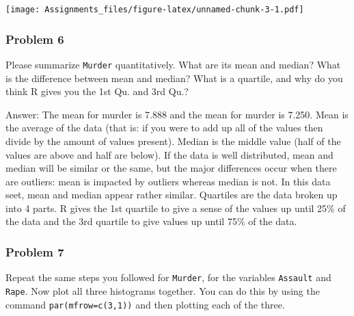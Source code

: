\documentclass[
]{article}
\newenvironment{Shaded}{\begin{snugshade}}{\end{snugshade}}
\newcommand{\DataTypeTok}[1]{\textcolor[rgb]{0.13,0.29,0.53}{#1}}
\newcommand{\DecValTok}[1]{\textcolor[rgb]{0.00,0.00,0.81}{#1}}
\newcommand{\KeywordTok}[1]{\textcolor[rgb]{0.13,0.29,0.53}{\textbf{#1}}}
\newcommand{\NormalTok}[1]{#1}
\newcommand{\OperatorTok}[1]{\textcolor[rgb]{0.81,0.36,0.00}{\textbf{#1}}}
\newcommand{\StringTok}[1]{\textcolor[rgb]{0.31,0.60,0.02}{#1}}
\begin{document}
\texttt{[image: Assignments\_files/figure-latex/unnamed-chunk-3-1.pdf]}

\hypertarget{problem-6}{%
\subsubsection{Problem 6}\label{problem-6}}

Please summarize \texttt{Murder} quantitatively. What are its mean and
median? What is the difference between mean and median? What is a
quartile, and why do you think R gives you the 1st Qu. and 3rd Qu.?

Answer: The mean for murder is 7.888 and the mean for murder is 7.250.
Mean is the average of the data (that is: if you were to add up all of
the values then divide by the amount of values present). Median is the
middle value (half of the values are above and half are below). If the
data is well distributed, mean and median will be similar or the same,
but the major differences occur when there are outliers: mean is
impacted by outliers whereas median is not. In this data seet, mean and
median appear rather similar. Quartiles are the data broken up into 4
parts. R gives the 1st quartile to give a sense of the values up until
25\% of the data and the 3rd quartile to give values up until 75\% of
the data.

\hypertarget{problem-7}{%
\subsubsection{Problem 7}\label{problem-7}}

Repeat the same steps you followed for \texttt{Murder}, for the
variables \texttt{Assault} and \texttt{Rape}. Now plot all three
histograms together. You can do this by using the command
\texttt{par(mfrow=c(3,1))} and then plotting each of the three.

\begin{Shaded}
\end{Shaded}
\end{document}
